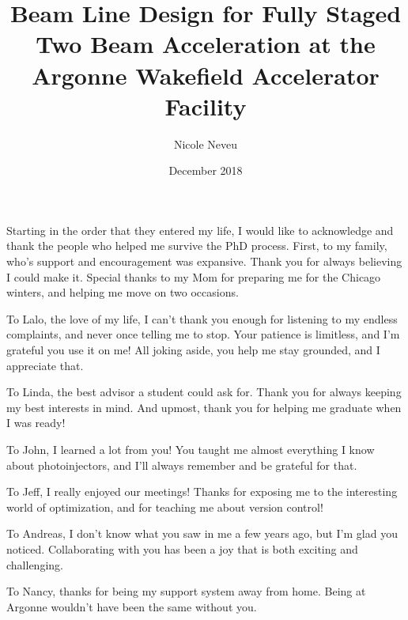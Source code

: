 \documentclass[table]{iitthesis}
\begin{document}
\title{Beam Line Design for Fully Staged Two Beam Acceleration at the Argonne Wakefield Accelerator Facility}

\author{Nicole Neveu }
\date{December 2018}
\copyrightnoticetrue      %
\maketitle                %


\prelimpages         %

\begin{acknowledgement}     %
	\par Starting in the order that they entered my life, I would like to acknowledge and thank
	the people who helped me survive the PhD process.	
	First, to my family, who's support and encouragement was expansive.
	Thank you for always believing I could make it.
	Special thanks to my Mom for preparing me for the Chicago winters, 
	and helping me move on two occasions.	
	
	To Lalo, the love of my life, I can't thank you enough for listening to my endless complaints,
	and never once telling me to stop. Your patience is limitless, and I'm grateful you use it on me!
	All joking aside, you help me stay grounded, and I appreciate that.
	
	To Linda, the best advisor a student could ask for. 
	Thank you for always keeping my best interests in mind.
	And upmost, thank you for helping me graduate when I was ready!	
	
	To John, I learned a lot from you! You taught me almost everything I know about photoinjectors, and I'll always remember and be grateful for that.
		
	To Jeff, I really enjoyed our meetings!
	Thanks for exposing me to the interesting world of optimization, 
	and for teaching me about version control! 
	
	To Andreas, I don't know what you saw in me a few years ago, but I'm glad you noticed.
	Collaborating with you has been a joy that is both exciting and challenging.
	
	To Nancy, thanks for being my support system away from home. 
	Being at Argonne wouldn't have been the same without you.
\end{acknowledgement}
\end{document}
